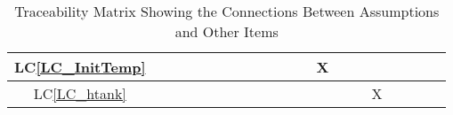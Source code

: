 \documentclass[12pt]{article}
\newcommand{\lcref}[1]{LC\ref{#1}}
\begin{document}
{\begin{landscape}
\begin{table}[h!]
\begin{tabular}{|c|c|c|c|c|c|c|c|c|c|c|c|c|c|c|c|c|c|c|c|}
				\lcref{LC_InitTemp} &                            &                 &                &               &                        &                  &                    &                &                 &                   &                 & X                 &                     &                  &                &                   &               &                    &                   \\ \hline
				\lcref{LC_htank}    &                            &                 &                &               &                        &                  &                    &                &                 &                   &                 &                   &                     &                  & X              &                   &               &                    &                   \\
				\hline
			\end{tabular}
			\caption{Traceability Matrix Showing the Connections Between Assumptions and Other Items}
			\label{Table:A_trace}
		\end{table}
	\end{landscape}
}
\end{document}
